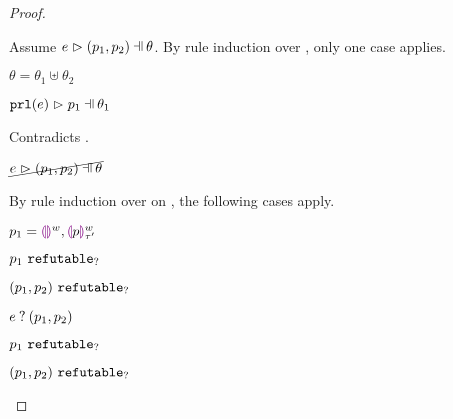 \begin{proof}
\begin{byCases}
\begin{byCases}
\begin{byCases}
\begin{pfsteps*}
            \end{pfsteps*}
            Assume $\hpatmatch{e}{\hpair{p_1}{p_2}}{\theta}$. By rule induction over , only one case applies.
            \begin{byCases}
            \item[\text{(\ref{rule:MNotIntroPair})}]
                \begin{pfsteps*}
                \item $\theta=\theta_1\uplus\theta_2$ 
                \item $\hpatmatch{\hprl{e}}{p_1}{\theta_1}$  
                \end{pfsteps*}
                Contradicts .
            \end{byCases}
            \begin{pfsteps*}
            \item $\cancel{\hpatmatch{e}{\hpair{p_1}{p_2}}{\theta}}$ 
            \end{pfsteps*}
            By rule induction over  on , the following cases apply.
            \begin{byCases}
            \item[\text{(\ref{rule:MMEHole}),(\ref{rule:MMHole})}]
                \begin{pfsteps*}
                \item $p_1=\textcolor{violet}{\llparenthesis}\textcolor{violet}{\rrparenthesis}^{w},\textcolor{violet}{\llparenthesis} p\textcolor{violet}{\rrparenthesis}^{w}_{\tau'}$ 
                \item $p_1 ~\mathtt{refutable}_?$  
                \item $(p_1 , p_2) ~\mathtt{refutable}_?$  
                \item $e \mathbin{?} (p_1 , p_2)$ 
                \end{pfsteps*}
            \item[\text{(\ref{rule:MMNotIntro})}]
                \begin{pfsteps*}
                \item $p_1 ~\mathtt{refutable}_?$  
                \item $(p_1 , p_2) ~\mathtt{refutable}_?$  

\end{pfsteps*}
\end{byCases}
\end{byCases}
\end{byCases}
\end{byCases}
\end{proof}
